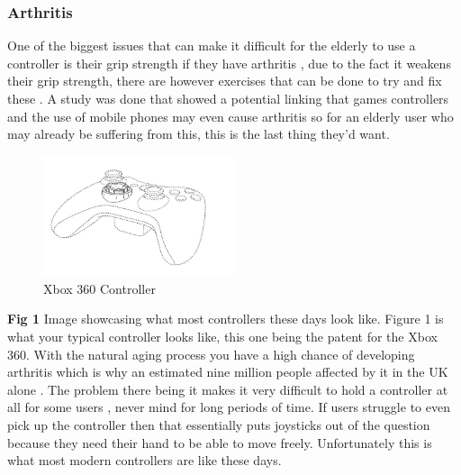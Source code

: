 \documentclass[journal]{IEEEtran}
\begin{document}
\subsubsection{Arthritis}
One of the biggest issues that can make it difficult for the elderly to use a controller is their grip strength if they have arthritis \cite{noauthor_managing_nodate}, due to the fact it weakens their grip strength, there are however exercises that can be done to try and fix these \cite{noauthor_managing_nodate}. A study was done that showed a potential linking that games controllers and the use of mobile phones may even cause arthritis \cite{noauthor_games_2011} so for an elderly user who may already be suffering from this, this is the last thing they'd want. 
\newline
\begin{figure}[!h]
\includegraphics[width=0.5\textwidth]{controller.JPG}
\caption{Xbox 360 Controller \cite{ikeda_game_2012} }
\label{fig:primingweb-img}
\end{figure} \textbf{Fig 1} Image showcasing what most controllers these days look like. 
\newline
Figure 1 is what your typical controller looks like, this one being the patent for the Xbox 360. With the natural aging process you have a high chance of developing arthritis which is why an estimated nine million people affected by it in the UK alone \cite{noauthor_arthritis_2017}. The problem there being it makes it very difficult to hold a controller at all for some users \cite{gamecentral_perils_2016}, never mind for long periods of time. If users struggle to even pick up the controller then that essentially puts joysticks out of the question because they need their hand to be able to move freely. Unfortunately this is what most modern controllers are like these days.
\end{document}
